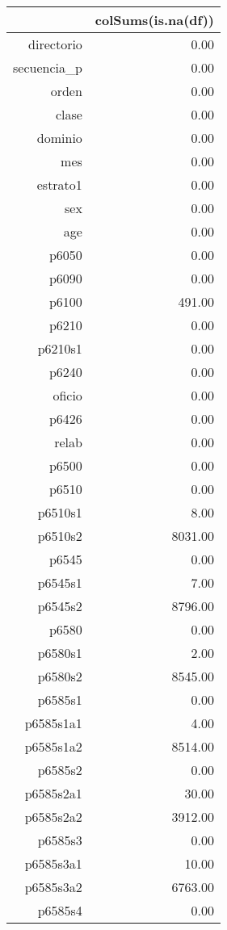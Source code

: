 \begin{table}[ht]
\centering
\begin{tabular}{rr}
  \hline
 & colSums(is.na(df)) \\ 
  \hline
directorio & 0.00 \\ 
  secuencia\_p & 0.00 \\ 
  orden & 0.00 \\ 
  clase & 0.00 \\ 
  dominio & 0.00 \\ 
  mes & 0.00 \\ 
  estrato1 & 0.00 \\ 
  sex & 0.00 \\ 
  age & 0.00 \\ 
  p6050 & 0.00 \\ 
  p6090 & 0.00 \\ 
  p6100 & 491.00 \\ 
  p6210 & 0.00 \\ 
  p6210s1 & 0.00 \\ 
  p6240 & 0.00 \\ 
  oficio & 0.00 \\ 
  p6426 & 0.00 \\ 
  relab & 0.00 \\ 
  p6500 & 0.00 \\ 
  p6510 & 0.00 \\ 
  p6510s1 & 8.00 \\ 
  p6510s2 & 8031.00 \\ 
  p6545 & 0.00 \\ 
  p6545s1 & 7.00 \\ 
  p6545s2 & 8796.00 \\ 
  p6580 & 0.00 \\ 
  p6580s1 & 2.00 \\ 
  p6580s2 & 8545.00 \\ 
  p6585s1 & 0.00 \\ 
  p6585s1a1 & 4.00 \\ 
  p6585s1a2 & 8514.00 \\ 
  p6585s2 & 0.00 \\ 
  p6585s2a1 & 30.00 \\ 
  p6585s2a2 & 3912.00 \\ 
  p6585s3 & 0.00 \\ 
  p6585s3a1 & 10.00 \\ 
  p6585s3a2 & 6763.00 \\ 
  p6585s4 & 0.00 \\ 

\end{tabular}
\end{table}
